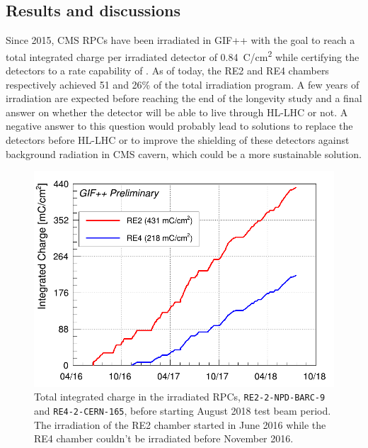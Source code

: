 	\subsection{Results and discussions}
	\label{chapt5:ssec:resultsGIFpp}
    
    Since 2015, CMS RPCs have been irradiated in GIF++ with the goal to reach a total integrated charge per irradiated detector of \SI{0.84}{C/cm^2} while certifying the detectors to a rate capability of . As of today, the RE2 and RE4 chambers respectively achieved 51 and 26\% of the total irradiation program. A few years of irradiation are expected before reaching the end of the longevity study and a final answer on whether the detector will be able to live through HL-LHC or not. A negative answer to this question would probably lead to solutions to replace the detectors before HL-LHC or to improve the shielding of these detectors against background radiation in CMS cavern, which could be a more sustainable solution.

	\begin{figure}[H]
        \centering
		\includegraphics[width = \plotwidth]{fig/chapt5/GIFpp-Qint.png}
		\caption{\label{fig:GIFppQint} Total integrated charge in the irradiated RPCs, \texttt{RE2-2-NPD-BARC-9} and \texttt{RE4-2-CERN-165}, before starting August 2018 test beam period. The irradiation of the RE2 chamber started in June 2016 while the RE4 chamber couldn't be irradiated before November 2016.}
	\end{figure}

\clearpage{\pagestyle{empty}\cleardoublepage}